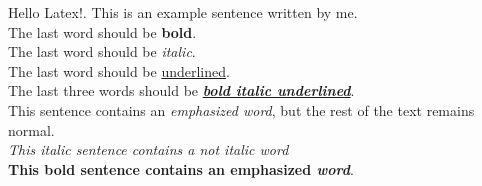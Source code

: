 
    \maketitle
    Hello Latex!. This is an example sentence written by me.
    \\
    The last word should be \textbf{bold}.      
    \\
    The last word should be \textit{italic}.
    \\
    The last word should be \underline{underlined}.
    \\
    The last three words should be \textbf{\textit{\underline{bold italic underlined}}}.
    \\
    This sentence contains an \emph{emphasized word}, but the rest of the text remains normal.
    \\
    \textit{This italic sentence contains a not italic \emph{word}}
    \\
    \textbf{This bold sentence contains an emphasized \emph{word}}.
    \\


